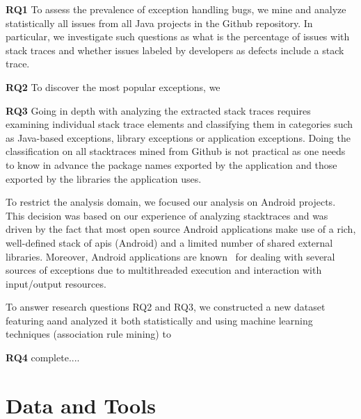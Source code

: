 \documentclass[conference]{IEEEtran}
\begin{document}
\textbf{RQ1} 
To assess the prevalence of exception handling bugs, we  mine and analyze statistically all issues 
from all Java projects in the Github repository.
In particular, we investigate such questions as 
what is the percentage of issues with stack traces and whether issues labeled by 
developers as defects include a stack trace.

\textbf{RQ2} To discover the most popular exceptions, we 

\textbf{RQ3} Going in depth with analyzing the extracted
stack traces requires examining individual stack trace elements and classifying
them in categories such as Java-based exceptions, library exceptions or
application exceptions. Doing the classification on all stacktraces mined from Github
is not practical as one needs to know in advance the package names exported by the application
and those exported by the libraries the application uses. 

To restrict the analysis domain, we focused our analysis on Android projects.
This decision was based on our experience
of analyzing stacktraces and was driven by the fact that most open source Android applications
make use of a rich, well-defined stack of {\sc api}s (Android) and a limited number of
shared external libraries. Moreover, Android applications are known~ for dealing with several sources of exceptions due to multithreaded execution and interaction with input/output resources.

To answer research questions RQ2 and RQ3, we constructed a new dataset featuring
aand
analyzed it both statistically and using machine learning techniques (association rule 
mining) to 

\textbf{RQ4} complete....

\section{Data and Tools}
\end{document}

